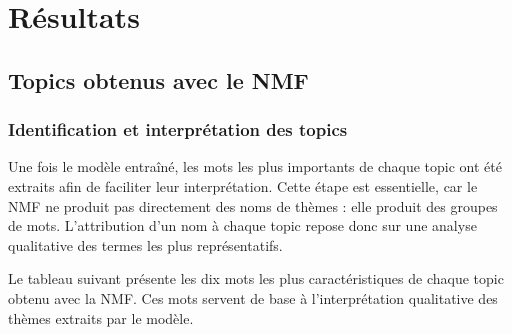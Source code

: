 \section{Résultats}

\subsection{Topics obtenus avec le NMF}
\subsubsection{Identification et interprétation des topics}

Une fois le modèle entraîné, les mots les plus importants de chaque topic ont été extraits afin de faciliter leur interprétation. Cette étape est essentielle, car le NMF ne produit pas directement des noms de thèmes : elle produit des groupes de mots. L'attribution d'un nom à chaque topic repose donc sur une analyse qualitative des termes les plus représentatifs.

Le tableau suivant présente les dix mots les plus caractéristiques de chaque topic obtenu avec la NMF. Ces mots servent de base à l'interprétation qualitative des thèmes extraits par le modèle.

